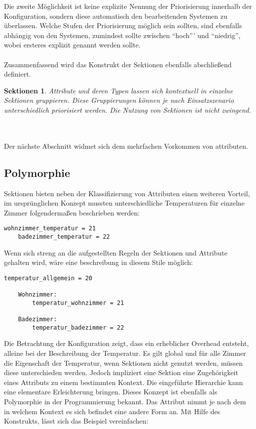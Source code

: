 Die zweite Möglichkeit ist keine explizite Nennung der Priorisierung innerhalb der Konfiguration, sondern diese automatisch den bearbeitenden Systemen zu überlassen. 
Welche Stufen der Priorisierung möglich sein sollten, sind ebenfalls abhängig von den Systemen, zumindest sollte zwischen "`hoch"'' und "`niedrig"', wobei ersteres explizit genannt werden sollte. 
\\\\
Zusammenfassend wird das Konstrukt der Sektionen ebenfalls abschließend definiert.
\newtheorem{mydef}{Sektionen}
\begin{mydef}
Attribute und deren Typen lassen sich kontextuell in einzelne Sektionen gruppieren. Diese Gruppierungen können je nach Einsatzszenario unterschiedlich priorisiert werden. Die Nutzung von Sektionen ist nicht zwingend.
\end{mydef}
\\\\
Der nächste Abschnitt widmet sich dem mehrfachen Vorkommen von attributen.

\subsection{Polymorphie}
Sektionen bieten neben der Klassifizierung von Attributen einen weiteren Vorteil, im ursprünglichen Konzept mussten unterschiedliche Temperaturen für einzelne Zimmer folgendermaßen beschrieben werden:

\lstset{language=bash}
\begin{lstlisting}[caption=Sammlung von Attributen ohne Polymorphie, captionpos=b]
  wohnzimmer_temperatur = 21
	badezimmer_temperatur = 22
\end{lstlisting}

Wenn sich streng an die aufgestellten Regeln der Sektionen und Attribute gehalten wird, wäre eine beschreibung in diesem Stile möglich: 


\lstset{language=bash}
\begin{lstlisting}[caption=Beispiel einer Konfiguration ohne Polymorphie, captionpos=b]
  temperatur_allgemein = 20
	
	Wohnzimmer: 
		temperatur_wohnzimmer = 21
	
	Badezimmer: 
		temperatur_badezimmer = 22

\end{lstlisting}
 
Die Betrachtung der Konfiguration zeigt, dass ein erheblicher Overhead entsteht, alleine bei der Beschreibung der Temperatur. Es gilt global und für alle Zimmer die Eigenschaft der Temperatur, wenn Sektionen nicht genutzt werden, müssen diese unterschieden werden. Jedoch impliziert eine Sektion eine Zugehörigkeit eines Attributs zu einem bestimmten Kontext. Die eingeführte Hierarchie kann eine elementare Erleichterung bringen. Dieses Konzept ist ebenfalls als Polymorphie in der Programmierung bekannt. Das Attribut nimmt je nach dem in welchem Kontext es sich befindet eine andere Form an. Mit Hilfe des Konstrukts, lässt sich das Beispiel vereinfachen: 

